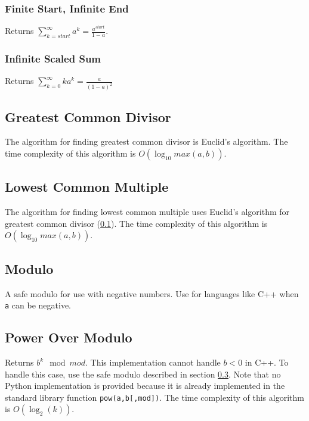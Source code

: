 \documentclass[letterpaper,11pt,twoside]{article}
\begin{document}
                \subsubsection{Finite Start, Infinite End}
                    Returns $\sum_{k=start}^{\infty}a^{k} = \frac{a^{start}}{1 - a}$.
                    
                    
                \subsubsection{Infinite Scaled Sum}
                    Returns $\sum_{k=0}^{\infty}ka^{k} = \frac{a}{(1-a)^{2}}$
                    
                    
            \subsection{Greatest Common Divisor} \label{gcd}
                The algorithm for finding greatest common divisor is Euclid's algorithm.
                The time complexity of this algorithm is $O(\log_{10} max(a,b))$.
                
                
            \subsection{Lowest Common Multiple}
                The algorithm for finding lowest common multiple uses Euclid's algorithm for greatest common divisor (\ref{gcd}).
                The time complexity of this algorithm is $O(\log_{10} max(a,b))$.
                
                
            \subsection{Modulo} \label{modulo}
                A safe modulo for use with negative numbers.
                Use for languages like C++ when \verb|a| can be negative.
                
            \subsection{Power Over Modulo} \label{power}
                Returns $b^{k} \mod mod$.
                This implementation cannot handle $b < 0$ in C++.
                To handle this case, use the safe modulo described in section \ref{modulo}.
                Note that no Python implementation is provided because it is already implemented in the standard library function \verb|pow(a,b[,mod])|.
                The time complexity of this algorithm is $O(\log_{2}(k))$.
                
\end{document}
